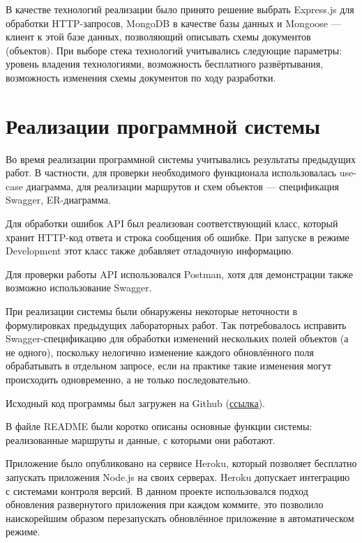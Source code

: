 \documentclass{hse_document}
\begin{document}
В качестве технологий реализации было принято решение выбрать Express.js для обработки HTTP-запросов, MongoDB в качестве базы данных и Mongoose --- клиент к этой базе данных, позволяющий описывать схемы документов (объектов). При выборе стека технологий учитывались следующие параметры: уровень владения технологиями, возможность бесплатного развёртывания, возможность изменения схемы документов по ходу разработки.


\section{Реализации программной системы}\label{sec:implementation}

Во время реализации программной системы учитывались результаты предыдущих работ. В частности, для проверки необходимого функционала использовалась use-case диаграмма, для реализации маршрутов и схем объектов --- спецификация Swagger, ER-диаграмма.


Для обработки ошибок API был реализован соответствующий класс, который хранит HTTP-код ответа и строка сообщения об ошибке. При запуске в режиме Development этот класс также добавляет отладочную информацию.

Для проверки работы API использовался Postman, хотя для демонстрации также возможно использование Swagger.

При реализации системы были обнаружены некоторые неточности в формулировках предыдущих лабораторных работ. Так потребовалось исправить Swagger-спецификацию для обработки изменений нескольких полей объектов (а не одного), поскольку нелогично изменение каждого обновлённого поля обрабатывать в отдельном запросе, если на практике такие изменения могут происходить одновременно, а не только последовательно.

Исходный код программы был загружен на Github (\href{https://github.com/frogix/workflow-engine-api}{ссылка}).

В файле README были коротко описаны основные функции системы: реализованные маршруты и данные, с которыми они работают.

Приложение было опубликовано на сервисе Heroku, который позволяет бесплатно запускать приложения Node.js на своих серверах. Heroku допускает интеграцию с системами контроля версий. В данном проекте использовался подход обновления развернутого приложения при каждом коммите, это позволило наискорейшим образом перезапускать обновлённое приложение в автоматическом режиме.
\end{document}
